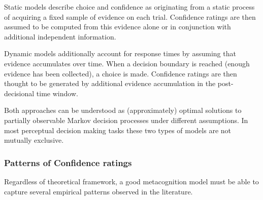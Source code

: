 \documentclass[
]{article}
\begin{document}
Static models describe choice and confidence as originating from a
static process of acquiring a fixed sample of evidence on each trial.
Confidence ratings are then assumed to be computed from this evidence
alone or in conjunction with additional independent information.

Dynamic models additionally account for response times by assuming that
evidence accumulates over time. When a decision boundary is reached
(enough evidence has been collected), a choice is made. Confidence
ratings are then thought to be generated by additional evidence
accumulation in the post-decisional time window.

Both approaches can be understood as (approximately) optimal solutions
to partially observable Markov decision processes under different
assumptions. In most perceptual decision making tasks these two types of
models are not mutually exclusive.

\subsubsection{Patterns of Confidence
ratings}\label{patterns-of-confidence-ratings}

Regardless of theoretical framework, a good metacognition model must be
able to capture several empirical patterns observed in the literature.
\end{document}
